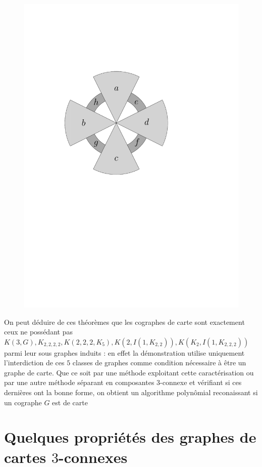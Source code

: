 \documentclass{scrartcl}
\begin{document}
\begin{flushleft}
\begin{figure}[h]
\begin{center}
        \includegraphics[page = \ipeFigcographsepind, scale = 0.7]{figs}
    \end{center}
\end{figure}

On peut déduire de ces théorèmes que les cographes de carte sont exactement ceux ne possédant pas $K(3, G), K_{2,2,2,2},
K(2,2,2,K_5), K(2, I(1, K_{2,2})), K(K_2, I(1, K_{2,2,2}))$
parmi leur sous graphes induits : en effet la démonstration utilise uniquement l'interdiction de ces $5$ classes de graphes comme condition nécessaire
à être un graphe de carte. Que ce soit par une méthode exploitant cette caractérisation ou par une autre méthode séparant en composantes
$3$-connexe et vérifiant si ces dernières ont la bonne forme, on obtient un algorithme polynômial reconaissant si un cographe $G$ est de carte

\section{Quelques propriétés des graphes de cartes $3$-connexes}


\end{flushleft}
\end{document}

